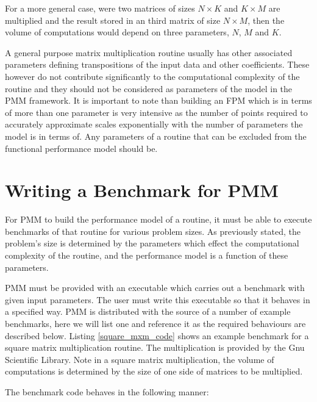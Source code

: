 \documentclass[a4paper,12pt]{report}
\begin{document}
    For a more general case, were two matrices of sizes $N \times K$ and $K
    \times M$ are multiplied and the result stored in an third matrix of size
    $N \times M$, then the volume of computations would depend on three
    parameters, $N$, $M$ and $K$.

    A general purpose matrix multiplication routine usually has other
    associated parameters defining transpositions of the input data and other
    coefficients. These however do not contribute significantly to the
    computational complexity of the routine and they should not be considered
    as parameters of the model in the PMM framework. It is important to note
    than building an FPM which is in terms of more than one parameter is very
    intensive as the number of points required to accurately approximate scales
    exponentially with the number of parameters the model is in terms of. Any
    parameters of a routine that can be excluded from the functional
    performance model should be.

    \section{Writing a Benchmark for PMM} \label{chap:writingbench}

    For PMM to build the performance model of a routine, it must be able to
    execute benchmarks of that routine for various problem sizes. As previously
    stated, the problem's size is determined by the parameters which effect the
    computational complexity of the routine, and the performance model is a
    function of these parameters.
    
    PMM must be provided with an executable which carries out a benchmark with
    given input parameters.  The user must write this executable so that it
    behaves in a specified way. PMM is distributed with the source of a number
    of example benchmarks, here we will list one and reference it as the
    required behaviours are described below. Listing \ref{square_mxm_code}
    shows an example benchmark for a square matrix multiplication routine. The
    multiplication is provided by the Gnu Scientific Library. Note in a square
    matrix multiplication, the volume of computations is determined by the size
    of one side of matrices to be multiplied.

    The benchmark code behaves in the following manner:
\end{document}
